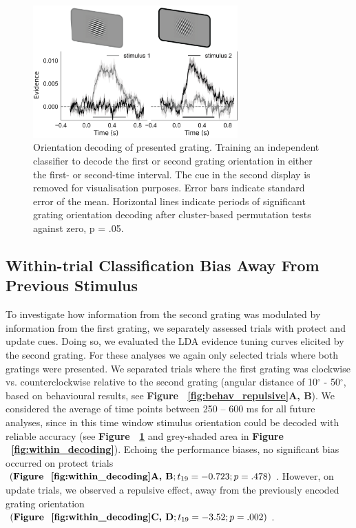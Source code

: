 \documentclass{article}
\begin{document}
\begin{figure}
\centering\includegraphics[width=0.7\textwidth]{figures/figure4_decoding} 
\caption[Orientation decoding of presented grating.]{Orientation decoding of presented grating. Training an independent classifier to decode the first or second grating orientation in either the first- or second-time interval. The cue in the second display is removed for visualisation purposes. Error bars indicate standard error of the mean. Horizontal lines indicate periods of significant grating orientation decoding after cluster-based permutation tests against zero, p = .05.}
\label{fig:decoding}\end{figure}


\subsection{Within-trial Classification Bias Away From Previous Stimulus}
To investigate how information from the second grating was modulated by information from the first grating, we separately assessed trials with protect and update cues. Doing so, we evaluated the LDA evidence tuning curves elicited by the second grating. For these analyses we again only selected trials where both gratings were presented. We separated trials where the first grating was clockwise vs. counterclockwise relative to the second grating (angular distance of 10$^{\circ}$ - 50$^{\circ}$, based on behavioural results, see \textbf{Figure ~\ref{fig:behav_repulsive}A, B}). We considered the average of time points between 250 – 600 ms for all future analyses, since in this time window stimulus orientation could be decoded with reliable accuracy (see \textbf{Figure ~\ref{fig:decoding}} and grey-shaded area in \textbf{Figure ~\ref{fig:within_decoding}}). Echoing the performance biases, no significant bias occurred on protect trials $(\text{\textbf{Figure ~\ref{fig:within_decoding}A, B}};  t\textsubscript{19} = -0.723; p = .478)$. However, on update trials, we observed a repulsive effect, away from the previously encoded grating orientation $(\text{\textbf{Figure ~\ref{fig:within_decoding}C, D}}; t\textsubscript{19}  = -3.52; p = .002)$. 
\end{document}
